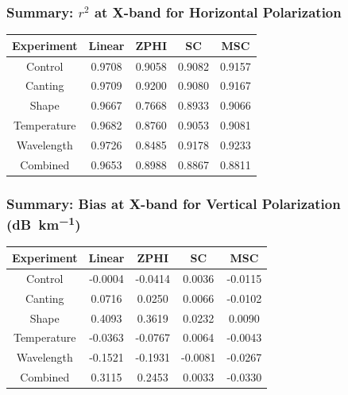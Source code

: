 \documentclass[red]{beamer}
\begin{document}
\begin{frame}
    \frametitle{Summary: $r^2$ at X-band for Horizontal Polarization}
    \begin{center}
        \begin{tabular}{| c | c | c | c | c |}
            \hline
            Experiment & Linear & ZPHI & SC & MSC \\
            \hline
            \hline
            Control & 0.9708 & 0.9058 & 0.9082 & 0.9157 \\
            Canting & 0.9709 & 0.9200 & 0.9080 & 0.9167 \\
            Shape & 0.9667 & 0.7668 & 0.8933 & 0.9066 \\
            Temperature & 0.9682 & 0.8760 & 0.9053 & 0.9081 \\
            Wavelength & 0.9726 & 0.8485 & 0.9178 & 0.9233 \\
            Combined & 0.9653 & 0.8988 & 0.8867 & 0.8811 \\
            \hline
        \end{tabular}
    \end{center}
\end{frame}

\begin{frame}
    \frametitle{Summary: Bias at X-band for Vertical Polarization (\si{dB\per \kilo\meter})}
    \begin{center}
        \begin{tabular}{| c | c | c | c | c |}
            \hline
            Experiment & Linear & ZPHI & SC & MSC \\
            \hline
            \hline
            Control & -0.0004 & -0.0414 & 0.0036 & -0.0115 \\
            Canting & 0.0716 & 0.0250 & 0.0066 & -0.0102 \\
            Shape & 0.4093 & 0.3619 & 0.0232 & 0.0090 \\
            Temperature & -0.0363 & -0.0767 & 0.0064 & -0.0043 \\
            Wavelength & -0.1521 & -0.1931 & -0.0081 & -0.0267 \\
            Combined & 0.3115 & 0.2453 & 0.0033 & -0.0330 \\
            \hline
        \end{tabular}
    \end{center}
\end{frame}
\end{document}
